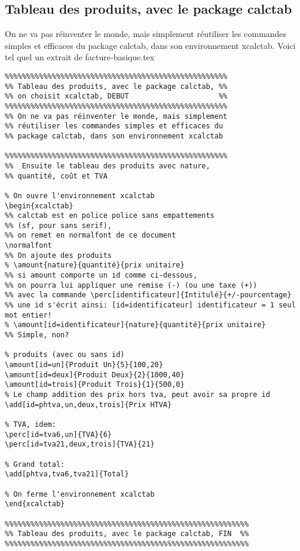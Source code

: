 \documentclass[a4paper,10pt]{article}
\begin{document}
\subsection{Tableau des produits, avec le package calctab}

On ne va pas réinventer le monde, mais simplement réutiliser les commandes
simples et efficaces du package calctab, dans son environnement xcalctab. Voici tel quel un extrait de facture-basique.tex

 
\begin{lstlisting}
%%%%%%%%%%%%%%%%%%%%%%%%%%%%%%%%%%%%%%%%%%%%%%%%%%%%
%% Tableau des produits, avec le package calctab, %%
%% on choisit xcalctab, DEBUT                     %%
%%%%%%%%%%%%%%%%%%%%%%%%%%%%%%%%%%%%%%%%%%%%%%%%%%%%
%% On ne va pas réinventer le monde, mais simplement 
%% réutiliser les commandes simples et efficaces du 
%% package calctab, dans son environnement xcalctab 

%%%%%%%%%%%%%%%%%%%%%%%%%%%%%%%%%%%%%%%%%%%%%%%%%%%%
%%  Ensuite le tableau des produits avec nature, 
%% quantité, coût et TVA

% On ouvre l'environnement xcalctab
\begin{xcalctab}
%% calctab est en police police sans empattements 
%% (sf, pour sans serif), 
%% on remet en normalfont de ce document
\normalfont
%% On ajoute des produits 
% \amount{nature}{quantité}{prix unitaire}
%% si amount comporte un id comme ci-dessous, 
%% on pourra lui appliquer une remise (-) (ou une taxe (+))
%% avec la commande \perc[identificateur]{Intitulé}{+/-pourcentage}
%% une id s'écrit ainsi: [id=identificateur] identificateur = 1 seul mot entier!
% \amount[id=identificateur]{nature}{quantité}{prix unitaire}
%% Simple, non?

% produits (avec ou sans id)
\amount[id=un]{Produit Un}{5}{100,20}
\amount[id=deux]{Produit Deux}{2}{1000,40}
\amount[id=trois]{Produit Trois}{1}{500,0}
% Le champ addition des prix hors tva, peut avoir sa propre id
\add[id=phtva,un,deux,trois]{Prix HTVA}

% TVA, idem:
\perc[id=tva6,un]{TVA}{6}
\perc[id=tva21,deux,trois]{TVA}{21}

% Grand total:
\add[phtva,tva6,tva21]{Total}

% On ferme l'environnement xcalctab
\end{xcalctab}

%%%%%%%%%%%%%%%%%%%%%%%%%%%%%%%%%%%%%%%%%%%%%%%%%%%%%%%%%
%% Tableau des produits, avec le package calctab, FIN  %%
%%%%%%%%%%%%%%%%%%%%%%%%%%%%%%%%%%%%%%%%%%%%%%%%%%%%%%%%%

\end{lstlisting}
\end{document}
